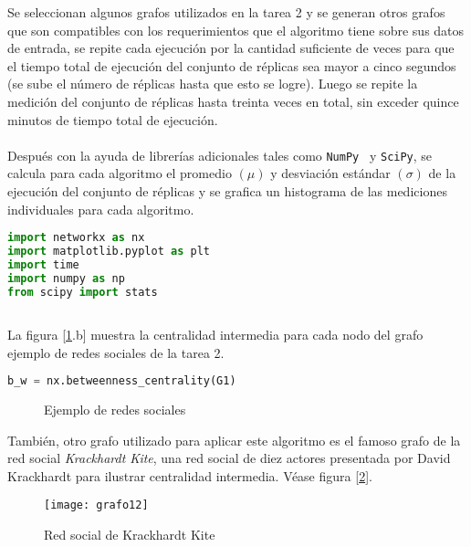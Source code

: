 \documentclass[a4paper, 11pt]{article}
\begin{document}
Se seleccionan algunos grafos utilizados en la tarea 2 y se generan otros grafos que son compatibles con los requerimientos que el algoritmo tiene sobre sus datos de entrada, se repite cada ejecución por la cantidad suficiente de veces para que el tiempo total de ejecución del conjunto de réplicas sea mayor a cinco segundos (se sube el número de réplicas hasta que esto se logre). Luego se repite la medición del conjunto de réplicas hasta treinta veces en total, sin exceder quince minutos de tiempo total de ejecución.
\\
\\
Después con la ayuda de librerías adicionales tales como \color{blue}\texttt{NumPy}\color{black} \ y \color{blue}\texttt{SciPy}\color{black}, se calcula para cada algoritmo el promedio $(\mu)$ y desviación estándar $(\sigma)$  de la ejecución del conjunto de réplicas y se grafica un histograma de las mediciones individuales para cada algoritmo.

\begin{lstlisting}[language=Python]
import networkx as nx
import matplotlib.pyplot as plt
import time
import numpy as np
from scipy import stats
\end{lstlisting}

\subsection*{}

La figura [\ref{figure1}.b] muestra la centralidad intermedia para cada nodo del grafo ejemplo de redes sociales de la tarea 2.

\begin{lstlisting}[language=Python]
b_w = nx.betweenness_centrality(G1)
\end{lstlisting}

\begin{figure}[H]
\centering
{}
\caption{Ejemplo de redes sociales} \label{figure1}
\end{figure}

También, otro grafo utilizado para aplicar este algoritmo es el famoso grafo de la red social \textit{Krackhardt Kite}, una red social de diez actores presentada por David Krackhardt para ilustrar centralidad intermedia. Véase figura [\ref{figure2}].

\begin{figure}[H]
\centering
\texttt{[image: grafo12]}
\caption{Red social de Krackhardt Kite} \label{figure2}
\end{figure}
\end{document}
